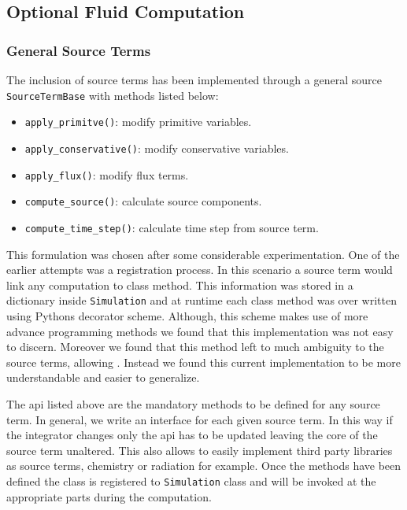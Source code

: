 \subsection{Optional Fluid Computation}
\subsubsection{General Source Terms}
The inclusion of source terms has been implemented through a general source
\lstinline{SourceTermBase} with methods listed below:
\begin{itemize}
    \item \lstinline{apply_primitve()}: modify primitive variables.
    \item \lstinline{apply_conservative()}: modify conservative variables.
    \item \lstinline{apply_flux()}: modify flux terms.
    \item \lstinline{compute_source()}: calculate source components.
    \item \lstinline{compute_time_step()}: calculate time step from source term.
\end{itemize}
This formulation was chosen after some considerable experimentation. One of the
earlier attempts was a registration process. In this scenario a source term
would link any computation to class method. This information was stored
in a dictionary inside \lstinline{Simulation} and at runtime each class method
was over written using Pythons decorator scheme. Although, this scheme makes
use of more advance programming methods we found that this implementation was
not easy to discern. Moreover we found that this method left to much ambiguity
to the source terms, allowing . Instead we
found this current implementation to be more understandable and easier to
generalize.

The api listed above are the mandatory methods to be defined for any source
term. In general, we write an interface for each given source term. In this
way if the integrator changes only the api has to be updated leaving
the core of the source term unaltered. This also allows to easily implement
third party libraries as source terms, chemistry or radiation for example.
Once the methods have been defined the class is registered to 
\lstinline{Simulation} class and will be invoked at the appropriate parts
during the computation.

